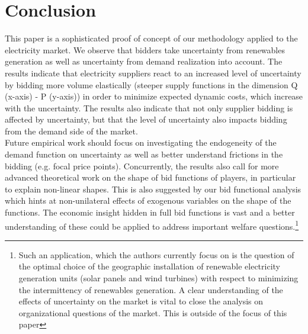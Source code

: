 \section{Conclusion}
\label{conclusion}
This paper is a sophisticated proof of concept of our methodology applied to the electricity market. We observe that bidders take uncertainty from renewables generation as well as uncertainty from demand realization into account. The results indicate that electricity suppliers react to an increased level of uncertainty by bidding more volume elastically (steeper supply functions in the dimension Q (x-axis) - P (y-axis)) in order to minimize expected dynamic costs, which increase with the uncertainty. The results also indicate that not only supplier bidding is affected by uncertainty, but that the level of uncertainty also impacts bidding from the demand side of the market.\\ 

Future empirical work should focus on investigating the endogeneity of the demand function on uncertainty as well as better understand frictions in the bidding (e.g. focal price points). Concurrently, the results also call for more advanced theoretical work on the shape of bid functions of players, in particular to explain non-linear shapes. This is also suggested by our bid functional analysis which hints at non-unilateral effects of exogenous variables on the shape of the functions. The economic insight hidden in full bid functions is vast and a better understanding of these could be applied to address important welfare questions.\footnote{Such an application, which the authors currently focus on is the question of the optimal choice of the geographic installation of renewable electricity generation units (solar panels and wind turbines) with respect to minimizing the intermittency of renewables generation. A clear understanding of the effects of uncertainty on the market is vital to close the analysis on organizational questions of the market. This is outside of the focus of this paper}\\

